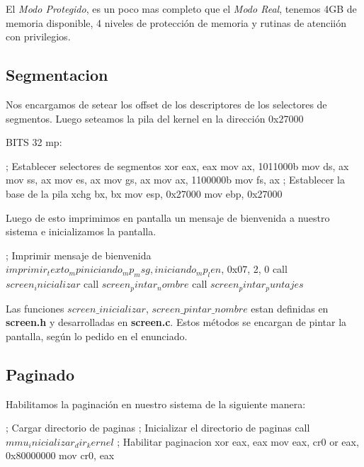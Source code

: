 El \textit{Modo Protegido}, es un poco mas completo que el \textit{Modo Real}, tenemos 4GB de memoria disponible, 4 niveles de protecci\'on de memoria y rutinas de atencii\'on con privilegios.

\subsection{Segmentacion}
Nos encargamos de setear los offset de los descriptores de los selectores de segmentos. Luego seteamos la pila del kernel en la direcci\'on 0x27000

\begin{algorithmic}
\State \tab BITS 32
\State \tab mp:

    \State \tab \tab ; Establecer selectores de segmentos
    \State \tab \tab xor eax, eax
    \State \tab \tab  mov ax, 1011000b
    \State \tab \tab  mov ds, ax
    \State \tab \tab  mov ss, ax
    \State \tab \tab  mov es, ax
    \State \tab \tab  mov gs, ax
    \State \tab \tab  mov ax, 1100000b
    \State \tab \tab  mov fs, ax
    \State \tab \tab  ; Establecer la base de la pila
    \State \tab \tab  xchg bx, bx
    \State \tab \tab  mov esp, 0x27000
    \State \tab \tab  mov ebp, 0x27000    
\end{algorithmic}

Luego de esto imprimimos en pantalla un mensaje de bienvenida a nuestro sistema e inicializamos la pantalla.
\begin{algorithmic}
    \State \tab \tab ; Imprimir mensaje de bienvenida
    \State \tab \tab $imprimir_texto_mp iniciando_mp_msg, iniciando_mp_len$, 0x07, 2, 0
    \State \tab \tab call $screen_inicializar$
    \State \tab \tab call $screen_pintar_nombre$
    \State \tab \tab call $screen_pintar_puntajes$
\end{algorithmic}

Las funciones \textit{$screen\_inicializar$}, \textit{$screen\_pintar\_nombre$} estan definidas en \textbf{screen.h} y desarrolladas en \textbf{screen.c}. Estos m\'etodos se encargan de pintar la pantalla, seg\'un lo pedido en el enunciado.

\subsection{Paginado}
Habilitamos la paginaci\'on en nuestro sistema de la siguiente manera:
\begin{algorithmic}
    \State \tab ; Cargar directorio de paginas
    \State \tab ; Inicializar el directorio de paginas
    \State \tab call $mmu_inicializar_dir_kernel$
    \State \tab ; Habilitar paginacion
    \State \tab xor eax, eax
    \State \tab mov eax, cr0
    \State \tab or eax, 0x80000000
    \State \tab mov cr0, eax
\end{algorithmic}

